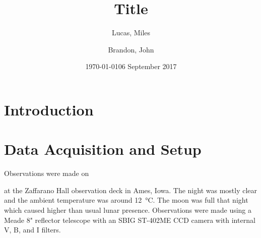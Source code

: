 \documentclass[%
aip,
jmp,
reprint,
floatfix
]{revtex4-1}
\begin{document}
	\title[Short title]{Title}

	\author{Lucas, Miles}
	\author{Brandon, John}

	\date{\today}



	\begin{abstract}


	\end{abstract}

	\maketitle


	\section{Introduction}




	\section{Data Acquisition and Setup}
	Observations were made on \date{06 September 2017} at the Zaffarano Hall observation deck in Ames, Iowa. The night was mostly clear and the ambient temperature was around \SI{12}{\degreeCelsius}. The moon was full that night which caused higher than usual lunar presence. Observations were made using a Meade 8" reflector telescope with an SBIG ST-402ME CCD camera with internal V, B, and I filters. 
	
\end{document}
